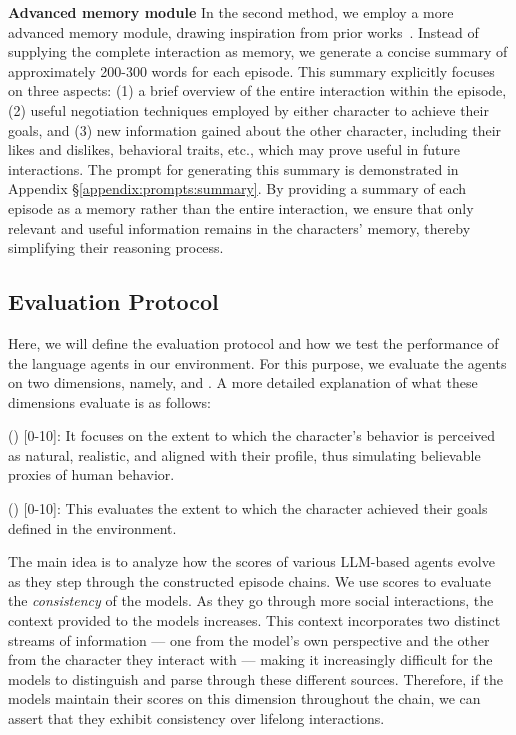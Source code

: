 \textbf{Advanced memory module} \quad In the second method, we employ a more advanced memory module, drawing inspiration from prior works~\citep{park2023generative, zhu2023ghostminecraftgenerallycapable, bae-etal-2022-keep, zhong-etal-2022-less}. Instead of supplying the complete interaction as memory, we generate a concise summary of approximately 200-300 words for each episode. This summary explicitly focuses on three aspects: (1) a brief overview of the entire interaction within the episode, (2) useful negotiation techniques employed by either character to achieve their goals, and (3) new information gained about the other character, including their likes and dislikes, behavioral traits, etc., which may prove useful in future interactions. The prompt for generating this summary is demonstrated in Appendix \S \ref{appendix:prompts:summary}. By providing a summary of each episode as a memory rather than the entire interaction, we ensure that only relevant and useful information remains in the characters' memory, thereby simplifying their reasoning process.

\subsection{Evaluation Protocol}
\label{sec:framework:evaluation}
Here, we will define the evaluation protocol and how we test the performance of the language agents in our environment. For this purpose, we evaluate the agents on two dimensions, namely, \believabilityFull and \goalcompletionFull. A more detailed explanation of what these dimensions evaluate is as follows: 

\believabilityFull (\believability) [0-10]: It focuses on the extent to which the character’s behavior is perceived as natural, realistic, and aligned with their profile, thus simulating believable proxies of human behavior.

\goalcompletionFull (\goalcompletion) [0-10]: This evaluates the extent to which the character achieved their goals defined in the environment. 

The main idea is to analyze how the scores of various LLM-based agents evolve as they step through the constructed episode chains. We use \believability scores to evaluate the \textit{consistency} of the models. As they go through more social interactions, the context provided to the models increases. This context incorporates two distinct streams of information — one from the model's own perspective and the other from the character they interact with — making it increasingly difficult for the models to distinguish and parse through these different sources. Therefore, if the models maintain their scores on this dimension throughout the chain, we can assert that they exhibit consistency over lifelong interactions.

